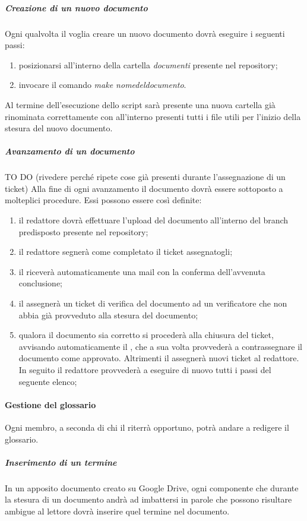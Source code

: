				\subparagraph{Creazione di un nuovo documento}
				Ogni qualvolta il \roleProjectManager{} voglia creare un nuovo documento dovrà eseguire i seguenti passi:
				\begin{enumerate}
					\item posizionarsi all'interno della cartella \emph{documenti} presente nel repository;
					\item invocare il comando \emph{make nome\textunderscore del\textunderscore documento}.
				\end{enumerate}
				Al termine dell'esecuzione dello script sarà presente una nuova cartella già rinominata correttamente con all'interno presenti tutti i file utili per l'inizio della stesura del nuovo documento.

				\subparagraph{Avanzamento di un documento} TO DO (rivedere perché ripete cose già presenti durante l'assegnazione di un ticket)
				Alla fine di ogni avanzamento il documento dovrà essere sottoposto a molteplici procedure. Essi possono essere così definite:
				\begin{enumerate}
					\item il redattore dovrà effettuare l'upload del documento all'interno del branch predisposto presente nel repository;
					\item il redattore segnerà come completato il ticket assegnatogli;
					\item il \roleProjectManager{} riceverà automaticamente una mail con la conferma dell'avvenuta conclusione;
					\item il \roleProjectManager{} assegnerà un ticket di verifica del documento ad un verificatore che non abbia già provveduto alla stesura del documento;
					\item qualora il documento sia corretto si procederà alla chiusura del ticket, avvisando automaticamente il \roleProjectManager{}, che a sua volta provvederà a contrassegnare il documento come approvato. Altrimenti il \roleVerifier{} assegnerà nuovi ticket al redattore. In seguito il redattore provvederà a eseguire di nuovo tutti i passi del seguente elenco;
				\end{enumerate}

			\paragraph{Gestione del glossario}
			Ogni membro, a seconda di chi il \roleProjectManager{} riterrà opportuno, potrà andare a redigere il glossario. \\
				\subparagraph{Inserimento di un termine}
				In un apposito documento creato su Google Drive, ogni componente che durante la stesura di un documento andrà ad imbattersi in parole che possono risultare ambigue al lettore dovrà inserire quel termine nel documento.
				
